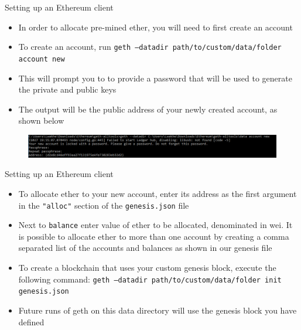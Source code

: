 \documentclass[10pt]{beamer}
\begin{document}
\begin{frame}{Setting up an Ethereum client}
	\begin{itemize}
		\item In order to allocate pre-mined ether, you will need to first create an account
		\item To create an account, run \texttt{geth ---datadir path/to/custom/data/folder account new}
		\item This will prompt you to to provide a password that will be used to generate the private and public keys
		\item The output will be the public address of your newly created account, as shown below
	\end{itemize}
	\begin{figure}[]
		\centering
		\includegraphics  [scale=0.4]{Images/geth5}
	\end{figure}
\end{frame}


\begin{frame}{Setting up an Ethereum client}
	\begin{itemize}
		\item To allocate ether to your new account, enter its address as the first argument in the \texttt{"alloc"} section of the \texttt{genesis.json} file
		\item Next to \texttt{balance} enter value of ether to be allocated, denominated in wei. It is possible to allocate ether to more than one account by creating a comma separated list of the accounts and balances as shown in our genesis file
		\item To create a blockchain that uses your custom genesis block, execute the following command: \texttt{geth ---datadir path/to/custom/data/folder init genesis.json}
		\item Future runs of geth on this data directory will use the genesis block you have defined
	\end{itemize}
\end{frame}

\end{document}
